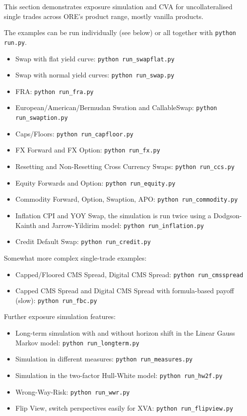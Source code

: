 This section demonstrates exposure simulation and CVA for uncollateralised single trades across ORE's product range, mostly vanilla products.

The examples can be run individually (see below) or all together with {\tt python run.py}.

\begin{itemize}
\item Swap with flat yield curve: {\tt python run\_swapflat.py}
\item Swap with normal yield curves: {\tt python run\_swap.py}
\item FRA: {\tt python run\_fra.py}
\item European/American/Bermudan Swation and CallableSwap: {\tt python run\_swaption.py}
\item Caps/Floors: {\tt python run\_capfloor.py}
\item FX Forward and FX Option: {\tt python run\_fx.py}
\item Resetting and Non-Resetting Cross Currency Swaps: {\tt python run\_ccs.py}
\item Equity Forwards and Option: {\tt python run\_equity.py}
\item Commodity Forward, Option, Swaption, APO: {\tt python run\_commodity.py}
\item Inflation CPI and YOY Swap, the simulation is run twice using a Dodgson-Kainth and Jarrow-Yildirim model: {\tt python run\_inflation.py}
\item Credit Default Swap: {\tt python run\_credit.py}
\end{itemize}

Somewhat more complex single-trade examples:
\begin{itemize}
\item Capped/Floored CMS Spread, Digital CMS Spread: {\tt python run\_cmsspread}
\item Capped CMS Spread and Digital CMS Spread with formula-based payoff (slow): {\tt python run\_fbc.py}
\end{itemize}

Further exposure simulation features:
\begin{itemize}
\item Long-term simulation with and without horizon shift in the Linear Gauss Markov model: {\tt python run\_longterm.py}
\item Simulation in different measures: {\tt python run\_measures.py}
\item Simulation in the two-factor Hull-White model: {\tt python run\_hw2f.py}
\item Wrong-Way-Risk: {\tt python run\_wwr.py}
\item Flip View, switch perspectives easily for XVA: {\tt python run\_flipview.py}
\end{itemize}

